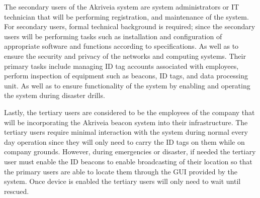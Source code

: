 \bigskip
The secondary users of the Akriveia system are system administrators or IT technician that will be 
performing registration, and maintenance of the system. For secondary users, formal technical background is required; since the secondary users will be performing tasks such as installation and configuration of appropriate software and functions according to specifications. As well as to ensure the security and privacy of the networks and computing systems. Their primary tasks include managing ID tag accounts associated with employees, perform inspection of equipment such as beacons, ID tags, and data processing unit. As well as to ensure functionality of the system by enabling and operating the system during disaster drills. 

\bigskip
Lastly, the tertiary users are considered to be the employees of the company that will be incorporating the Akriveia beacon system into their infrastructure. The tertiary users require minimal interaction with the system during normal every day operation since they will only need to carry the ID tags on them while on company grounds. However, during emergencies or disaster, if needed the tertiary user must enable the ID beacons to enable broadcasting of their location so that the primary users are able to locate them through the GUI provided by the system. Once device is enabled the tertiary users will only need to wait until rescued.





